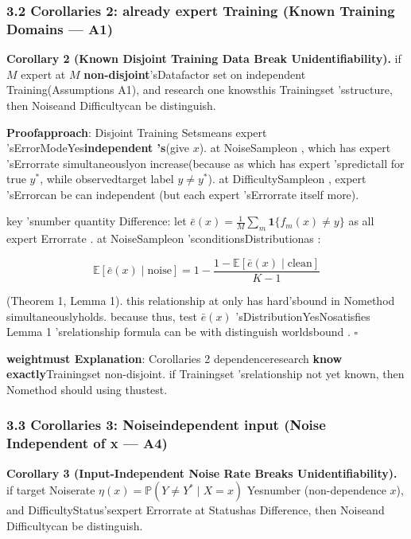 \documentclass[
  12pt,
]{article}
\begin{document}
\subsubsection{3.2 Corollaries 2: already expert Training (Known Training Domains ---
A1)}\label{ux63a8ux8bba-2ux5df2ux77e5ux4e13ux5bb6ux8badux7ec3ux57df-known-training-domains-a1}

\textbf{Corollary 2 (Known Disjoint Training Data Break
Unidentifiability).} if  \(M\) expert at  \(M\)
\textbf{non-disjoint}'sDatafactor set on independent Training(Assumptions
A1), and research one knowsthis Trainingset 'sstructure, then Noiseand Difficultycan be distinguish. 

\textbf{Proofapproach}: Disjoint Training Setsmeans expert 'sErrorModeYes\textbf{independent 's}(give 
\(x\)). at NoiseSampleon , which has expert 'sErrorrate simultaneouslyon increase(because as which has expert 'spredictall for true
\(y^*\), while observedtarget label
\(y \neq y^*\)). at DifficultySampleon , expert 'sErrorcan be can independent (but each expert 'sErrorrate itself more). 

key 'snumber quantity Difference: let
\(\bar{e}(x) = \frac{1}{M}\sum_m \mathbf{1}\{f_m(x) \neq y\}\)
as all expert Errorrate . at NoiseSampleon 'sconditionsDistributionas : 

\[\mathbb{E}[\bar{e}(x) \mid \text{noise}] = 1 - \frac{1 - \mathbb{E}[\bar{e}(x) \mid \text{clean}]}{K-1}\]

(Theorem 1, Lemma
1). this relationship at only has hard'sbound in Nomethod simultaneouslyholds. because thus, test \(\bar{e}(x)\)
'sDistributionYesNosatisfies  Lemma 1 'srelationship formula can be with distinguish worldsbound . \(\square\)

\textbf{weightmust Explanation}: Corollaries 2
dependenceresearch \textbf{know exactly}Trainingset non-disjoint. if Trainingset 'srelationship not yet known, then Nomethod should using thustest. 

\subsubsection{3.3 Corollaries 3: Noiseindependent input (Noise Independent of x ---
A4)}\label{ux63a8ux8bba-3ux566aux58f0ux72ecux7acbux4e8eux8f93ux5165-noise-independent-of-x-a4}

\textbf{Corollary 3 (Input-Independent Noise Rate Breaks
Unidentifiability).} if target Noiserate 
\(\eta(x) = \mathbb{P}(Y \neq Y^* \mid X = x)\) Yesnumber (non-dependence
\(x\)), and DifficultyStatus'sexpert Errorrate at Statushas Difference, then Noiseand Difficultycan be distinguish. 
\end{document}
